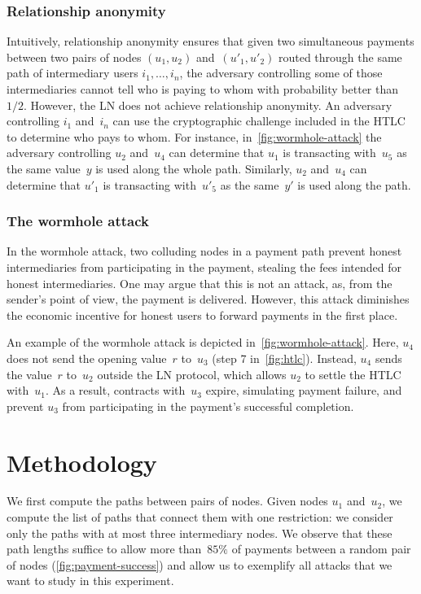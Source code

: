 \subsubsection*{Relationship anonymity}
Intuitively, relationship anonymity ensures that given two simultaneous payments between two pairs of nodes $(u_1, u_2)$ and~$(u'_1, u'_2)$ routed through the same path of intermediary users $i_1, \ldots, i_n$, the adversary controlling some of those intermediaries cannot tell who is paying to whom with probability better than~$1/2$.
However, the LN does not achieve relationship anonymity.
An adversary controlling $i_1$ and~$i_n$ can use the cryptographic challenge included in the HTLC to determine who pays to whom.
For instance, in~\cref{fig:wormhole-attack} the adversary controlling $u_2$ and~$u_4$ can determine that $u_1$ is transacting with~$u_5$ as the same value~$y$ is used along the whole path.
Similarly, $u_2$ and~$u_4$ can determine that $u'_1$ is transacting with~$u'_5$ as the same~$y'$ is used along the path.

\subsubsection*{The wormhole attack}
In the wormhole attack, two colluding nodes in a payment path prevent honest intermediaries from participating in the payment, stealing the fees intended for honest intermediaries.
One may argue that this is not an attack, as, from the sender's point of view, the payment is delivered.
However, this attack diminishes the economic incentive for honest users to forward payments in the first place.

An example of the wormhole attack is depicted in~\cref{fig:wormhole-attack}.
Here, $u_4$ does not send the opening value~$r$ to~$u_3$ (step 7 in~\cref{fig:htlc}).
Instead, $u_4$ sends the value~$r$ to~$u_2$ outside the LN protocol, which allows $u_2$ to settle the HTLC with~$u_1$.
As a result, contracts with~$u_3$ expire, simulating payment failure, and prevent $u_3$ from participating in the payment's successful completion.


\section{Methodology}

We first compute the paths between pairs of nodes.
Given nodes $u_1$ and~$u_2$, we compute the list of paths that connect them with one restriction: we consider only the paths with at most three intermediary nodes.
We observe that these path lengths suffice to allow more than~$85\%$ of payments between a random pair of nodes (\cref{fig:payment-success}) and allow us to exemplify all attacks that we want to study in this experiment.

